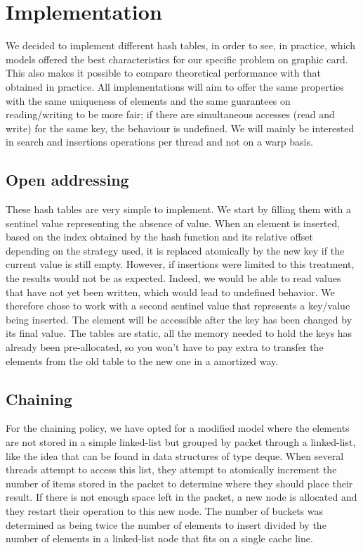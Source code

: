
\section{Implementation}

We decided to implement different hash tables, in order to see, in practice, which models offered the best characteristics for our specific problem on graphic card. This also makes it possible to compare theoretical performance with that obtained in practice.
All implementations will aim to offer the same properties with the same uniqueness of elements and the same guarantees on reading/writing to be more fair; if there are simultaneous accesses (read and write) for the same key, the behaviour is undefined. We will mainly be interested in search and insertions operations per thread and not on a warp basis.

\subsection{Open addressing}

These hash tables are very simple to implement. We start by filling them with a sentinel value representing the absence of value. When an element is inserted, based on the index obtained by the hash function and its relative offset depending on the strategy used, it is replaced atomically by the new key if the current value is still empty. However, if insertions were limited to this treatment, the results would not be as expected. Indeed, we would be able to read values that have not yet been written, which would lead to undefined behavior. We therefore chose to work with a second sentinel value that represents a key/value being inserted. The element will be accessible after the key has been changed by its final value. The tables are static, all the memory needed to hold the keys has already been pre-allocated, so you won't have to pay extra to transfer the elements from the old table to the new one in a amortized way.

\subsection{Chaining}

For the chaining policy, we have opted for a modified model where the elements are not stored in a simple linked-list but grouped by packet through a linked-list, like the idea that can be found in data structures of type deque. When several threads attempt to access this list, they attempt to atomically increment the number of items stored in the packet to determine where they should place their result. If there is not enough space left in the packet, a new node is allocated and they restart their operation to this new node. The number of buckets was determined as being twice the number of elements to insert divided by the number of elements in a linked-list node that fits on a single cache line.

